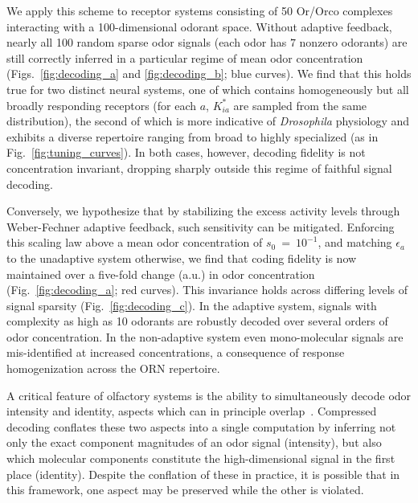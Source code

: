 We apply this scheme to receptor systems consisting of 50 Or/Orco complexes interacting with a 100-dimensional odorant space. Without adaptive feedback, nearly all 100 random sparse odor signals (each odor has $7$ nonzero odorants) are still correctly inferred in a particular regime of mean odor concentration (Figs.~\ref{fig:decoding_a} and \ref{fig:decoding_b}; blue curves). We find that this holds true for two distinct neural systems, one of which contains homogeneously but all broadly responding receptors (for each $a$, $K^*_{ia}$ are sampled from the same distribution), the second of which is more indicative of \textit{Drosophila} physiology and exhibits a diverse repertoire ranging from broad to highly specialized (as in Fig.~\ref{fig:tuning_curves}). In both cases, however, decoding fidelity is not concentration invariant, dropping sharply outside this regime of faithful signal decoding.

Conversely, we hypothesize that by stabilizing the excess activity levels through Weber-Fechner adaptive feedback, such sensitivity can be mitigated. Enforcing this scaling law above a mean odor concentration of $s_0~=~10^{-1}$, and matching $\epsilon_a$ to the unadaptive system otherwise, we find that coding fidelity is now maintained over a five-fold change (a.u.) in odor concentration (Fig.~\ref{fig:decoding_a}; red curves). %
This invariance holds across differing levels of signal sparsity (Fig.~\ref{fig:decoding_c}). In the adaptive system, signals with complexity as high as 10 odorants are robustly decoded over several orders of odor concentration. In the non-adaptive system even mono-molecular signals are mis-identified at increased concentrations, a consequence of response homogenization across the ORN repertoire.


A critical feature of olfactory systems is the ability to simultaneously decode odor intensity and identity, aspects which can in principle overlap~\cite{intensity_vs_identity, segregation_intensity_identity}. Compressed decoding conflates these two aspects into a single computation by inferring not only the exact component magnitudes of an odor signal (intensity), but also which molecular components constitute the high-dimensional signal in the first place (identity). Despite the conflation of these in practice, it is possible that in this framework, one aspect may be preserved while the other is violated. 

